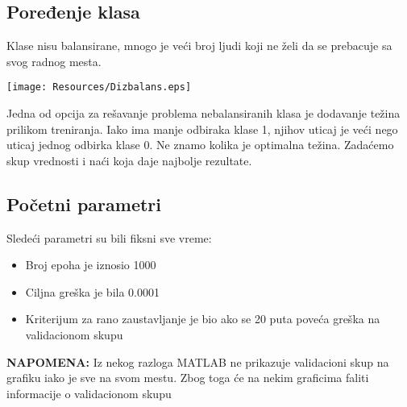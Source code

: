 \documentclass{article}
\newenvironment{solution}[2][]
    { \begin{mdframed}[backgroundcolor=gray!0] \textbf{#1 #2}}
    {  \end{mdframed}}
\begin{document}
    \begin{solution}{}
    \subsection*{Poređenje klasa}
        Klase nisu balansirane, mnogo je veći broj ljudi koji ne želi da se prebacuje sa svog radnog mesta.
        \begin{center}
        \texttt{[image: Resources/Dizbalans.eps]}
        \end{center}
        Jedna od opcija za rešavanje problema nebalansiranih klasa je dodavanje težina prilikom treniranja. Iako ima manje odbiraka klase 1, njihov uticaj je veći nego uticaj jednog odbirka klase 0. Ne znamo kolika je optimalna težina. Zadaćemo skup vrednosti i naći koja daje najbolje rezultate.
    
    
    \end{solution}
    \begin{solution}{}
    \subsection*{Početni parametri}
    Sledeći parametri su bili fiksni sve vreme:
    \begin{itemize}
        \item Broj epoha je iznosio 1000
        \item Ciljna greška je bila 0.0001
        \item Kriterijum za rano zaustavljanje je bio ako se 20 puta poveća greška na validacionom skupu
    \end{itemize}
    \textbf{NAPOMENA:} Iz nekog razloga MATLAB ne prikazuje validacioni skup na grafiku iako je sve na svom mestu. Zbog toga će na nekim graficima faliti informacije o validacionom skupu
    
    \end{solution}
\end{document}
